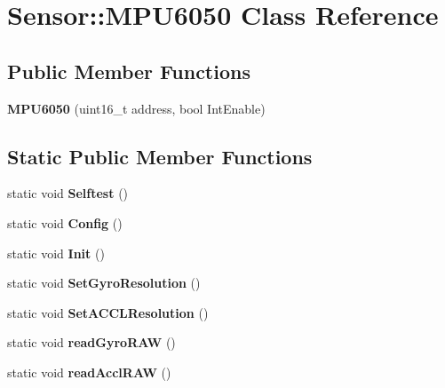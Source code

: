 \hypertarget{classSensor_1_1MPU6050}{}\section{Sensor\+::M\+P\+U6050 Class Reference}
\label{classSensor_1_1MPU6050}
\subsection*{Public Member Functions}
\begin{DoxyCompactItemize}
\item 
\mbox{\label{classSensor_1_1MPU6050_a4337504892ac68158e931db396394cb4}} 
{\bfseries M\+P\+U6050} (uint16\+\_\+t address, bool Int\+Enable)
\end{DoxyCompactItemize}
\subsection*{Static Public Member Functions}
\begin{DoxyCompactItemize}
\item 
\mbox{\label{classSensor_1_1MPU6050_a032dc1628ba752682e9946af354806e0}} 
static void {\bfseries Selftest} ()
\item 
\mbox{\label{classSensor_1_1MPU6050_aff1ddd176379260467d6c9298ff4947e}} 
static void {\bfseries Config} ()
\item 
\mbox{\label{classSensor_1_1MPU6050_a99ea2843428bb6a5e1be7918f801c740}} 
static void {\bfseries Init} ()
\item 
\mbox{\label{classSensor_1_1MPU6050_a884ce6f3611872be1e2ae8edc2597148}} 
static void {\bfseries Set\+Gyro\+Resolution} ()
\item 
\mbox{\label{classSensor_1_1MPU6050_af55129df7e9ab209a493fd13769515b3}} 
static void {\bfseries Set\+A\+C\+C\+L\+Resolution} ()
\item 
\mbox{\label{classSensor_1_1MPU6050_a382126e687b83396014cbcbbc40d758c}} 
static void {\bfseries read\+Gyro\+R\+AW} ()
\item 
\mbox{\label{classSensor_1_1MPU6050_aa04bc07a49d6d7f187127c9fea171e8c}} 
static void {\bfseries read\+Accl\+R\+AW} ()
\end{DoxyCompactItemize}
